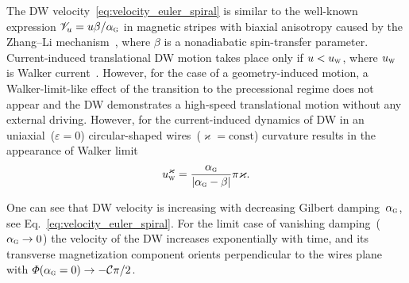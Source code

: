 The DW velocity~\eqref{eq:velocity_euler_spiral} is similar to the well-known expression $\mathscr{V}_u = u \beta/\alpha_\textsc{g}$ in magnetic stripes with biaxial anisotropy caused by the Zhang--Li mechanism~\cite{Bazaliy98,Zhang04}, where $\beta$ is a nonadiabatic spin-transfer parameter. Current-induced translational DW motion takes place only if $u<u_\textsc{w}$, where $u_\textsc{w}$ is Walker current~\cite{Thiaville05}. However, for the case of a geometry-induced motion, a Walker-limit-like effect of the transition to the precessional regime does not appear and the DW demonstrates a high-speed translational motion without any external driving. However, for the current-induced dynamics of DW in an uniaxial~($\varepsilon=0$) circular-shaped wires~($\varkappa=\text{const}$) curvature results in the appearance of Walker limit~\cite{Yershov16}
\begin{equation}
u_\textsc{w}^\varkappa=\frac{\alpha_\textsc{g}}{|\alpha_\textsc{g}-\beta|}\pi\varkappa.
\end{equation}

One can see that DW velocity is increasing with decreasing Gilbert damping~$\alpha_\textsc{g}$, see Eq.~\eqref{eq:velocity_euler_spiral}. For the limit case of vanishing damping~($\alpha_\textsc{g}\to0$) the velocity of the DW increases exponentially with time, and its transverse magnetization component orients perpendicular to the wires plane with $\varPhi(\alpha_\textsc{g}=0)\to-\mathcal{C}\pi/2$.


